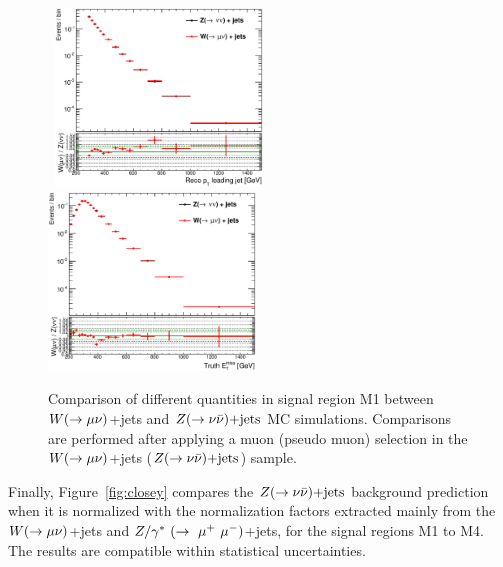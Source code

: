\begin{figure}
\begin{center}
{}                                                                          
\mbox{                                                                     
  \includegraphics[width=0.49\textwidth]{Appendix_ClosureTestZnunu/Figures/compareNormalized_pt1_A6_Nom_CRcutsWZFiducialMu.eps}
  \includegraphics[width=0.49\textwidth]{Appendix_ClosureTestZnunu/Figures/compareNormalized_truth_met_A6_Nom_CRcutsWZFiducialMu.eps}
}
\end{center}
\caption[Comparison of different quantities in signal region M1 between $\wmn$+jets and $\znn$ MC simulations.
Comparisons are performed after applying a muon (pseudo muon) selection in the $\wmn$+jets ($\znn$) sample.]{Comparison of different quantities in signal region M1 between $\wmn$+jets and $\znn$ MC simulations.
Comparisons are performed after applying a muon (pseudo muon) selection in the $\wmn$+jets ($\znn$) sample.
}
\label{fig:closure8}
\end{figure}

Finally, Figure~\ref{fig:closey} compares the $\znn$ background prediction when it is normalized with the normalization factors extracted mainly from the $\wmn$+jets and $Z/\gamma^*~(\rightarrow~\mu^+~\mu^-)$+jets, for the signal regions M1 to M4.
The results are compatible within statistical uncertainties.

